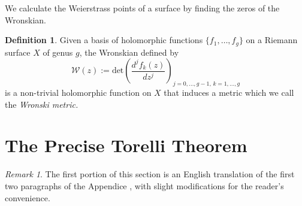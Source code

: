 \documentclass[12pt,reqno]{amsart}
\newcommand{\R}{\mathbb{R}}
\theoremstyle{definition}
\newtheorem{defn}{Definition}
\theoremstyle{remark}
\newtheorem*{remark}{Remark}
\newcommand{\ti}{\todo[inline]}
\begin{document}
We calculate the Weierstrass points of a surface by finding the zeros of the Wronskian.
\begin{defn} Given a basis of holomorphic functions $\{f_1, \ldots , f_g\}$ on a Riemann surface $X$ of genus $g$, the Wronskian defined by $$\mathcal{W}(z) := \textrm{det} \left( \frac{d^j f_k(z)}{d z^j} \right)_{j = 0, \ldots , g - 1, \, k = 1, \ldots , g}$$ is a non-trivial holomorphic function on $X$ that induces a metric which we call the \textit{Wronski metric.} 
\end{defn}







\section{The Precise Torelli Theorem}
\label{sec:torelli}


\begin{remark} The first portion of this section is an English translation of the first two paragraphs of the Appendice \cite{Torelli}, with slight modifications for the reader's convenience.\end{remark}
\end{document}
